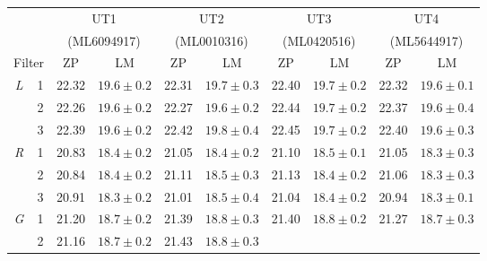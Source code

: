 \begin{colsection}
\begin{colsection}
\begin{table}[p]
    \begin{center}
        \begin{tabular}{cc|cc|cc|cc|cc} %
             & &
            \multicolumn{2}{c|}{UT1} &
            \multicolumn{2}{c|}{UT2} &
            \multicolumn{2}{c|}{UT3} &
            \multicolumn{2}{c}{UT4}
            \\
             & &
            \multicolumn{2}{c|}{{\footnotesize(ML6094917)}} &
            \multicolumn{2}{c|}{{\footnotesize(ML0010316)}} &
            \multicolumn{2}{c|}{{\footnotesize(ML0420516)}} &
            \multicolumn{2}{c}{{\footnotesize(ML5644917)}}
            \\
            \multicolumn{2}{c|}{Filter} &
            ZP & LM & ZP & LM & ZP & LM & ZP & LM \\
            \midrule
            \textit{L} & 1 &
            22.32 & $19.6 \pm 0.2$ &
            22.31 & $19.7 \pm 0.3$ &
            22.40 & $19.7 \pm 0.2$ &
            22.32 & $19.6 \pm 0.1$
            \\
            & 2 &
            22.26 & $19.6 \pm 0.2$ &
            22.27 & $19.6 \pm 0.2$ &
            22.44 & $19.7 \pm 0.2$ &
            22.37 & $19.6 \pm 0.4$
            \\
            & 3 &
            22.39 & $19.6 \pm 0.2$ &
            22.42 & $19.8 \pm 0.4$ &
            22.45 & $19.7 \pm 0.2$ &
            22.40 & $19.6 \pm 0.3$
            \\
            \midrule
            \textit{R} & 1 &
            20.83 & $18.4 \pm 0.2$ &
            21.05 & $18.4 \pm 0.2$ &
            21.10 & $18.5 \pm 0.1$ &
            21.05 & $18.3 \pm 0.3$
            \\
            & 2 &
            20.84 & $18.4 \pm 0.2$ &
            21.11 & $18.5 \pm 0.3$ &
            21.13 & $18.4 \pm 0.2$ &
            21.06 & $18.3 \pm 0.3$
            \\
            & 3 &
            20.91 & $18.3 \pm 0.2$ &
            21.01 & $18.5 \pm 0.4$ &
            21.04 & $18.4 \pm 0.2$ &
            20.94 & $18.3 \pm 0.1$
            \\
            \midrule
            \textit{G} & 1 &
            21.20 & $18.7 \pm 0.2$ &
            21.39 & $18.8 \pm 0.3$ &
            21.40 & $18.8 \pm 0.2$ &
            21.27 & $18.7 \pm 0.3$
            \\
            & 2 &
            21.16 & $18.7 \pm 0.2$ &
            21.43 & $18.8 \pm 0.3$ &

\end{tabular}
\end{center}
\end{table}
\end{colsection}
\end{colsection}
